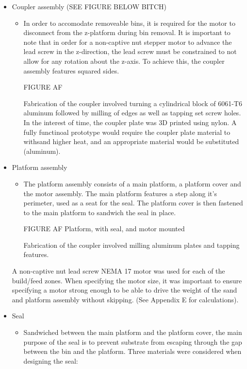 \documentclass[11pt]{article}
\begin{document}
\begin{itemize}
\item Coupler assembly (SEE FIGURE BELOW BITCH)
	\begin{itemize}
	\item In order to accomodate removeable bins, it is required for the motor to disconnect from the z-platform during bin removal. It is important to note that in order for a non-captive nut stepper motor to advance the lead screw in the z-direction, the lead screw must be constrained to not allow for any rotation about the z-axis. To achieve this, the coupler assembly features squared sides. 

FIGURE AF

Fabrication of the coupler involved turning a cylindrical block of 6061-T6 aluminum followed by milling of edges as well as tapping set screw holes. In the interest of time, the coupler plate was 3D printed using nylon. A fully functinoal prototype would require the coupler plate material to withsand higher heat, and an appropriate material would be substituted (aluminum). 
	\end{itemize}
\item Platform assembly
	\begin{itemize}
	\item The platform assembly consists of a main platform, a platform cover and the motor assembly. The main platform features a step along it's perimeter, used as a seat for the seal. The platform cover is then fastened to the main platform to sandwich the seal in place.

FIGURE AF Platform, with seal, and motor mounted

Fabrication of the coupler involved milling aluminum plates and tapping features. 
	\end{itemize}

A non-captive nut lead screw NEMA 17 motor was used for each of the build/feed zones. When specifying the motor size, it was important to ensure specifying a motor strong enough to be able to drive the weight of the sand and platform assembly without skipping. (See Appendix E for calculations).
\item Seal
	\begin{itemize}
	\item Sandwiched between the main platform and the platform cover, the main purpose of the seal is to prevent substrate from escaping through the gap between the bin and the platform. Three materials were considered when designing the seal: 
	\end{itemize}


\end{itemize}
\end{document}

